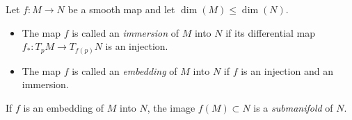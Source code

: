 \begin{Def}
  Let $f:M\to N$ be a smooth map and let $\dim(M)\leq \dim(N)$.
  \begin{itemize}
  \item The map $f$ is called an \emph{immersion} 
    of $M$ into $N$ if its differential map \mbox{$f_*:T_p M\to T_{f(p)}N$} is an injection.
  \item The map $f$ is called an \emph{embedding} 
    of $M$ into $N$ if $f$ is an injection and an immersion.
  \end{itemize}
  If $f$ is an embedding of $M$ into $N$, the image $f(M)\subset N$ is a \emph{submanifold} 
  of $N$.
\end{Def}

\begin{center}








\end{center}
